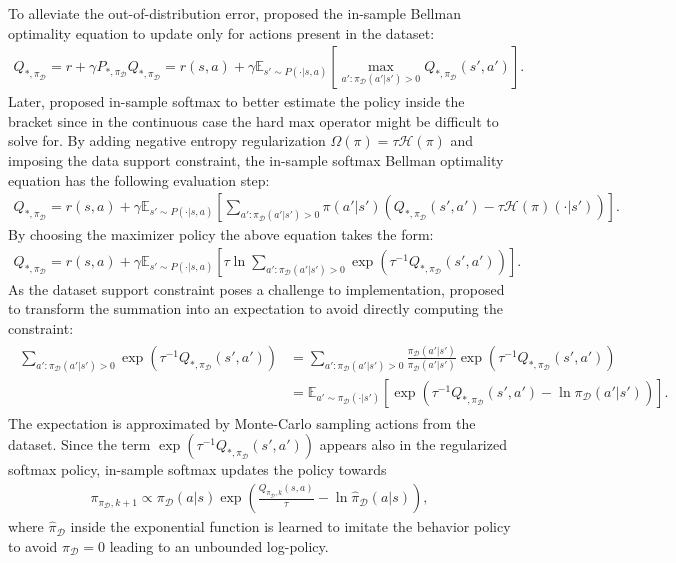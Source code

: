 \documentclass{article}
\newcommand{\AdaBracket}[1]{\left(#1\right)}
\newcommand{\AdaRectBracket}[1]{\left[#1\right]}
\newcommand{\expectation}[2]{\mathbb{E}_{#1}\AdaRectBracket{#2}}
\newcommand{\entropy}{\mathcal{H}\left( \pi \right)}
\newcommand{\datasetOptimalQ}{Q_{*, \pi_{\mathcal{D}}}}
\newcommand{\datasetPolicy}{\pi_{\mathcal{D}}}
\begin{document}
To alleviate the out-of-distribution error, \citet{Fujimoto2019-InSampleMax} proposed the in-sample Bellman optimality equation to update only for actions present in the dataset:
\begin{align}
    \datasetOptimalQ = r + \gamma P_{*, \datasetPolicy} \datasetOptimalQ = r(s,a) + \gamma \expectation{s'\sim P(\cdot | s,a)}{\max_{a': \datasetPolicy(a'|s') > 0} \datasetOptimalQ(s',a')}.
\end{align}
Later, \citet{Xiao2023-InSampleSoftmax} proposed in-sample softmax to better estimate the policy inside the bracket since in the continuous case the hard max operator might be difficult to solve for.
By adding negative entropy regularization $\Omega(\pi) = \tau \entropy$ and imposing the data support constraint, the in-sample softmax Bellman optimality equation has the following evaluation step:
\begin{align}
    \datasetOptimalQ = r(s,a) +  \gamma \expectation{s'\sim P(\cdot | s,a)}{ \sum_{a': \datasetPolicy(a'|s') > 0} \!\!\!\!\! \pi(a'|s') \AdaBracket{\datasetOptimalQ(s',a') - \tau\entropy(\cdot|s')}}.
    \label{eq:insample_softmax}
\end{align}
By choosing the maximizer policy the above equation takes the form:
\begin{align}
    \datasetOptimalQ = r(s,a) +  \gamma \expectation{s'\sim P(\cdot | s,a)}{\tau \ln \!\!\!\!\!\sum_{a': \datasetPolicy(a'|s') > 0} \!\!\!\!\! \exp\AdaBracket{\tau^{-1} \datasetOptimalQ(s',a')}}.
\end{align}
As the dataset support constraint poses a challenge to implementation, \citet{Xiao2023-InSampleSoftmax} proposed to transform the summation into an expectation to avoid directly computing the constraint: 
\begin{align}
    \begin{split}
    \sum_{a': \datasetPolicy(a'|s') > 0} \!\!\!\!\!\!\exp\AdaBracket{\tau^{-1}\datasetOptimalQ (s',a')} &= \!\!\!\!\!\!\sum_{a': \datasetPolicy(a'|s') > 0} \frac{\datasetPolicy(a'|s')}{\datasetPolicy(a'|s')} \exp\AdaBracket{\tau^{-1}\datasetOptimalQ (s',a')} \\
    &= \expectation{a'\sim\datasetPolicy(\cdot | s')}{\exp\AdaBracket{\tau^{-1}\datasetOptimalQ (s',a') - \ln\datasetPolicy(a'|s')}}.
    \end{split}
\end{align}
The expectation is approximated by Monte-Carlo sampling actions from the dataset.
Since the term $\exp\AdaBracket{\tau^{-1}\datasetOptimalQ (s',a')}$ appears also in the regularized softmax policy, in-sample softmax updates the policy towards 
\begin{align}
    \pi_{\datasetPolicy, k+1} \propto  \datasetPolicy(a|s) \exp\AdaBracket{\frac{Q_{\datasetPolicy, k}(s,a)}{\tau} - \ln\hat{\pi}_{\mathcal{D}}(a|s)},
    \label{eq:inac_policy}
\end{align}
where $\hat{\pi}_{\mathcal{D}}$ inside the exponential function is learned to imitate the behavior policy to avoid $\pi_{\mathcal{D}} = 0$ leading to an unbounded log-policy.
\end{document}
